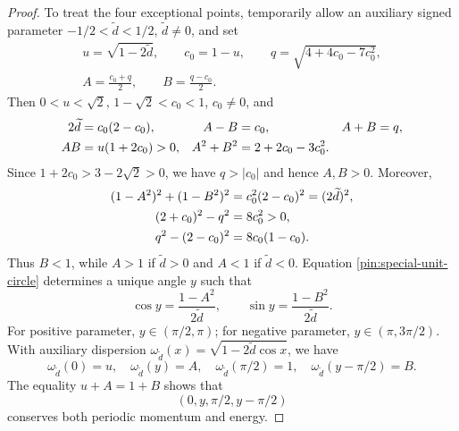 \begin{proof}
To treat the four exceptional points, temporarily allow an auxiliary
signed parameter $-1/2<\widetilde d<1/2$, $\widetilde d\ne0$, and set
\begin{equation}
 \begin{gathered}
 u=\sqrt{1-2\widetilde d},\qquad c_0=1-u,
 \qquad q=\sqrt{4+4c_0-7c_0^2},\\
 A=\frac{c_0+q}{2},\qquad B=\frac{q-c_0}{2}.
 \end{gathered}
 \label{pin:special-parameters}
\end{equation}
Then $0<u<\sqrt2$, $1-\sqrt2<c_0<1$, $c_0\ne0$, and
\begin{align}
 2\widetilde d&=c_0(2-c_0),&
 A-B&=c_0,& A+B&=q,\notag\\
 AB&=u(1+2c_0)>0,&
 A^2+B^2&=2+2c_0-3c_0^2.
 \label{pin:special-algebra-a}
\end{align}
Since $1+2c_0>3-2\sqrt2>0$, we have $q>|c_0|$ and hence $A,B>0$.
Moreover,
\begin{align}
 (1-A^2)^2+(1-B^2)^2&=c_0^2(2-c_0)^2=(2\widetilde d)^2,
 \label{pin:special-unit-circle}\\
 (2+c_0)^2-q^2&=8c_0^2>0,\notag\\
 q^2-(2-c_0)^2&=8c_0(1-c_0).
 \label{pin:special-signs}
\end{align}
Thus $B<1$, while $A>1$ if $\widetilde d>0$ and $A<1$ if
$\widetilde d<0$. Equation \eqref{pin:special-unit-circle} determines
a unique angle $y$ such that
\begin{equation}
              \cos y=\frac{1-A^2}{2\widetilde d},\qquad
              \sin y=\frac{1-B^2}{2\widetilde d}.
 \label{pin:special-y}
\end{equation}
For positive parameter, $y\in(\pi/2,\pi)$; for negative parameter,
$y\in(\pi,3\pi/2)$. With auxiliary dispersion
$\omega_{\widetilde d}(x)=\sqrt{1-2\widetilde d\cos x}$, we have
\[
 \omega_{\widetilde d}(0)=u,\quad
 \omega_{\widetilde d}(y)=A,\quad
 \omega_{\widetilde d}(\pi/2)=1,\quad
 \omega_{\widetilde d}(y-\pi/2)=B.
\]
The equality $u+A=1+B$ shows that
\begin{equation}
                          (0,y,\pi/2,y-\pi/2)
 \label{pin:special-quartet}
\end{equation}
conserves both periodic momentum and energy.


\end{proof}
